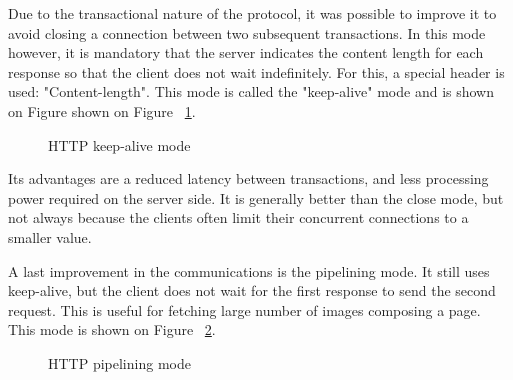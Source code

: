 Due to the transactional nature of the protocol, it was possible to improve it
to avoid closing a connection between two subsequent transactions. In this mode
however, it is mandatory that the server indicates the content length for each
response so that the client does not wait indefinitely. For this, a special
header is used: "Content-length". This mode is called the "keep-alive" mode
and is shown on Figure shown on Figure ~\ref{fig:http_keep_alive}.


\begin{figure}[!h]
\centering
{}

\caption{HTTP keep-alive mode}
\label{fig:http_keep_alive}
\end{figure}

Its advantages are a reduced latency between transactions, and less processing
power required on the server side. It is generally better than the close mode,
but not always because the clients often limit their concurrent connections to
a smaller value.

A last improvement in the communications is the pipelining mode. It still uses
keep-alive, but the client does not wait for the first response to send the
second request. This is useful for fetching large number of images composing a
page. This mode is shown on Figure ~\ref{fig:http_pipelining}.

\begin{figure}[!h]
  \centering

\caption{HTTP pipelining mode}
\label{fig:http_pipelining}
\end{figure}

